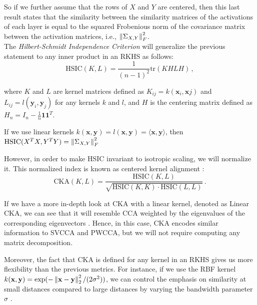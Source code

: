 \documentclass[../main.tex]{subfiles}
\begin{document}
\begin{itemize}
    So if we further assume that the rows of $X$ and $Y$ are centered, then this last result states that the similarity between the similarity matrices of the activations of each layer is equal to the squared Frobenious norm of the covariance matrix between the activation matrices, i.e., $\left\lVert \Sigma_{X, Y} \right\rVert_F^2$.\\

    The \emph{Hilbert-Schmidt Independence Criterion} \cite{gretton_measuring_2005} will generalize the previous statement to any inner product in an RKHS as follows:
    \[
    \text{HSIC}(K, L) = \frac{1}{(n-1)^2}\text{tr}(KHLH)\,,
    \]
    \begin{sloppypar}
     where $K$ and $L$ are kernel matrices defined as $K_{ij}=k(\mathbf{x}_i, \mathbf{x}j)$ and $L_{ij}=l(\mathbf{y}_i, \mathbf{y}_j)$ for any kernels $k$ and $l$, and $H$ is the centering matrix defined as $H_n= I_n - \frac{1}{n}\mathbf{1}\mathbf{1}^T$. 
    \end{sloppypar}
     
    \begin{remark}
        If we use linear kernels $k(\mathbf{x}, \mathbf{y})=l(\mathbf{x}, \mathbf{y})=\langle\mathbf{x}, \mathbf{y}\rangle$, then $\text{HSIC}(X^T X,Y^T Y) = \left\lVert \Sigma_{X, Y} \right\rVert_F^2$
    \end{remark}

    However, in order to make HSIC invariant to isotropic scaling, we will normalize it. This normalized index is known as centered kernel alignment \cite{kornblith_similarity_2019}:
    \begin{equation}
    \label{eq:CKA}
    \text{CKA}(K, L) = \frac{\text{HSIC}(K,L)}{\sqrt{\text{HSIC}(K,K) \cdot \text{HSIC}(L,L)}}\,.    
    \end{equation}


    If we have a more in-depth look at CKA with a linear kernel, denoted as Linear CKA, we can see that it will resemble CCA weighted by the eigenvalues of the corresponding eigenvectors \cite{kornblith_similarity_2019}. Hence, in this case, CKA encodes similar information to SVCCA and PWCCA, but we will not require computing any matrix decomposition.
    
    Moreover, the fact that CKA is defined for any kernel in an RKHS gives us more flexibility than the previous metrics. For instance, if we use the RBF kernel $k(\mathbf{x}, \mathbf{y}) = \exp(-\left\lVert \mathbf{x}-\mathbf{y} \right\rVert_2^2/(2\sigma^2))$,  we can control the emphasis on similarity at small distances compared to large distances by varying the bandwidth parameter $\sigma$ \cite{kornblith_similarity_2019}.
    

\end{itemize}
\end{document}
